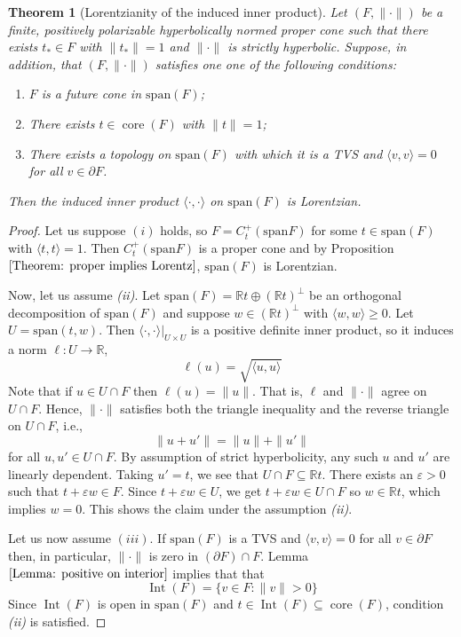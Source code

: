 \documentclass[a4paper,11pt]{article}
\numberwithin{equation}{section}
\theoremstyle{definition}
\theoremstyle{plain}
\newtheorem{Theorem}[Definition]{Theorem}
\newcommand{\R}{\mathbb R}
\newcommand{\spn}{\mathrm{span}}
\DeclareMathOperator{\core}{\text{core}}
\DeclareMathOperator{\Int}{Int}
\let\epsilon\varepsilon
\newcommand{\inner}[2]{\langle #1, #2 \rangle}
\newcommand{\norm}[1]{\| #1\|}
\begin{document}
\begin{Theorem}[Lorentzianity of the induced inner product] \label{Theorem: innerproductLorentzian}
    Let $(F,\norm{\cdot})$ be a finite, positively polarizable hyperbolically normed proper cone such that there exists $t_* \in F$ with $\norm{t_*} = 1$ and $\norm{\cdot}$ is strictly hyperbolic. Suppose, in addition, that $(F,\norm{\cdot})$ satisfies one one of the following conditions:
    \begin{enumerate}
        \item[(i)] $F$ is a future cone in $\spn(F)$;
        \item[(ii)] There exists $t \in \core(F)$ with $\norm{t} = 1$;
        \item[(iii)] There exists a topology on $\spn(F)$ with which it is a TVS and $\inner{v}{v} = 0$ for all $v \in \partial F$.
    \end{enumerate}
    Then the induced inner product $\inner{\cdot}{\cdot}$ on $\spn(F)$ is Lorentzian.
\end{Theorem}
\begin{proof}
    Let us suppose $(i)$ holds, so $F = C_{t}^{+}(\spn F)$ for some $t \in \spn(F)$ with $\inner{t}{t} = 1$. Then $C_{t}^{+}(\spn F)$ is a proper cone and by Proposition $\ref{Theorem: proper implies Lorentz}$, $\spn(F)$ is Lorentzian. 
    
    Now, let us assume \textit{(ii)}. Let $\spn(F) = \R t \oplus (\R t)^{\perp}$ be an orthogonal decomposition of $\spn(F)$ and suppose $w \in (\R t)^{\perp}$ with $\inner{w}{w} \geq 0$. Let $U = \spn(t, w)$. Then $\inner{\cdot}{\cdot}|_{U \times U}$ is a positive definite inner product, so it induces a norm $\ell: U \longrightarrow \R$,
    $$\ell(u) = \sqrt{\inner{u}{u}}$$
    Note that if $u \in U \cap F$ then $\ell(u) = \norm{u}$. That is, $\ell$ and $\norm{\cdot}$ agree on $U \cap F$. Hence, $\norm{\cdot}$ satisfies both the triangle inequality and the reverse triangle on $U \cap F$, i.e.,
    $$\norm{u + u'} = \norm{u} + \norm{u'}$$
    for all $u, u' \in U \cap F$. By assumption of strict hyperbolicity, any such $u$ and $u'$ are linearly dependent. Taking $u' = t$, we see that $U \cap F \subseteq \R t$. There exists an $\epsilon > 0$ such that $t + \epsilon w \in F$. Since $t + \epsilon w \in U$, we get $t + \epsilon w \in U \cap F$ so $w \in \R t$, which implies $w = 0$. This shows the claim under the assumption \textit{(ii)}.
    
    Let us now assume $(iii)$. If $\spn(F)$ is a TVS and $\inner{v}{v} = 0$ for all $v \in \partial F$ then, in particular, $\norm{\cdot}$ is zero in $(\partial F) \cap F$. Lemma $\ref{Lemma: positive on interior}$ implies that that
    $$\Int(F) = \{v \in F: \norm{v} > 0\}$$
    Since $\Int(F)$ is open in $\spn(F)$ and $t \in \Int(F) \subseteq \core(F)$, condition \textit{(ii)} is satisfied.
\end{proof}
\end{document}
